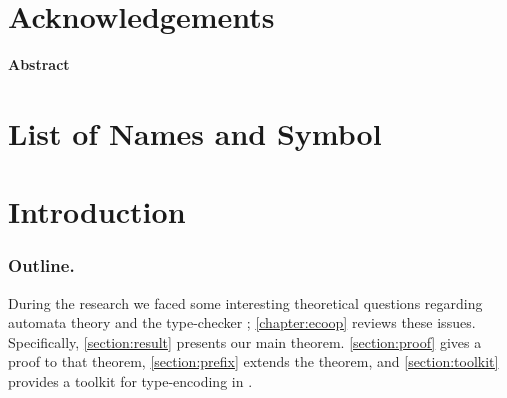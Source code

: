 \documentclass[12pt]{book}
\begin{document}
\maketitle
\frontmatter

\chapter*{Acknowledgements}
\label{chapter:acknowledgements}


\cleardoublepage{}
\begin{centering}
  \hfill \Large\bfseries Abstract\hfill
\end{centering}
\begin{quote}
  \slshape
  \large
  
\end{quote}

\tableofcontents
\cleardoublepage{}

\listoftables
\cleardoublepage{}

\listoffigures
\cleardoublepage{}

\listofalgorithms
\cleardoublepage{}

\lstlistoflistings
\cleardoublepage{}

\chapter*{List of Names and Symbol}



\mainmatter

\chapter{Introduction}
\label{chapter:introduction}


\subsection*{Outline.}

During the research we faced some interesting theoretical questions regarding
automata theory and the \Java type-checker ; \cref{chapter:ecoop} reviews
these issues. Specifically, \cref{section:result} presents our main theorem.
\cref{section:proof} gives a proof to that theorem, \cref{section:prefix}
extends the theorem, and \cref{section:toolkit} provides a toolkit for type-encoding
in \Java.
\end{document}

